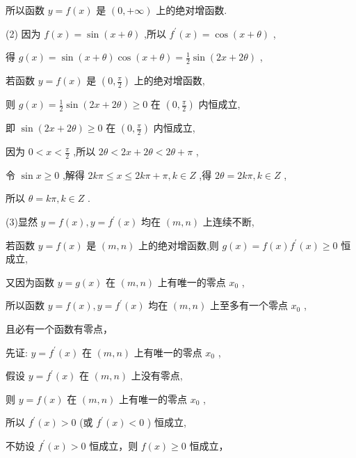 \documentclass[10pt]{article}
\begin{document}
所以函数 \(y = f\left( x\right)\) 是 \(\left( {0, + \infty }\right)\) 上的绝对增函数.

(2) 因为 \(f\left( x\right)  = \sin \left( {x + \theta }\right)\) ,所以 \({f}^{\prime }\left( x\right)  = \cos \left( {x + \theta }\right)\) ,

得 \(g\left( x\right)  = \sin \left( {x + \theta }\right) \cos \left( {x + \theta }\right)  = \frac{1}{2}\sin \left( {{2x} + {2\theta }}\right)\) ,

若函数 \(y = f\left( x\right)\) 是 \(\left( {0,\frac{\pi }{2}}\right)\) 上的绝对增函数,

则 \(g\left( x\right)  = \frac{1}{2}\sin \left( {{2x} + {2\theta }}\right)  \geq  0\) 在 \(\left( {0,\frac{\pi }{2}}\right)\) 内恒成立,

即 \(\sin \left( {{2x} + {2\theta }}\right)  \geq  0\) 在 \(\left( {0,\frac{\pi }{2}}\right)\) 内恒成立,

因为 \(0 < x < \frac{\pi }{2}\) ,所以 \({2\theta } < {2x} + {2\theta } < {2\theta } + \pi\) ,

令 \(\sin x \geq  0\) ,解得 \({2k\pi } \leq  x \leq  {2k\pi } + \pi ,k \in  Z\) ,得 \({2\theta } = {2k\pi },k \in  Z\) ,

所以 \(\theta  = {k\pi },k \in  Z\) .

(3)显然 \(y = f\left( x\right) ,y = {f}^{\prime }\left( x\right)\) 均在 \(\left( {m,n}\right)\) 上连续不断,

若函数 \(y = f\left( x\right)\) 是 \(\left( {m,n}\right)\) 上的绝对增函数,则 \(g\left( x\right)  = f\left( x\right) {f}^{\prime }\left( x\right)  \geq  0\) 恒成立,

又因为函数 \(y = g\left( x\right)\) 在 \(\left( {m,n}\right)\) 上有唯一的零点 \({x}_{0}\) ,

所以函数 \(y = f\left( x\right) ,y = {f}^{\prime }\left( x\right)\) 均在 \(\left( {m,n}\right)\) 上至多有一个零点 \({x}_{0}\) ,

且必有一个函数有零点，

先证: \(y = {f}^{\prime }\left( x\right)\) 在 \(\left( {m,n}\right)\) 上有唯一的零点 \({x}_{0}\) ,

假设 \(y = {f}^{\prime }\left( x\right)\) 在 \(\left( {m,n}\right)\) 上没有零点,

则 \(y = f\left( x\right)\) 在 \(\left( {m,n}\right)\) 上有唯一的零点 \({x}_{0}\) ,

所以 \({f}^{\prime }\left( x\right)  > 0\) (或 \({f}^{\prime }\left( x\right)  < 0\) ) 恒成立,

不妨设 \({f}^{\prime }\left( x\right)  > 0\) 恒成立，则 \(f\left( x\right)  \geq  0\) 恒成立，
\end{document}

